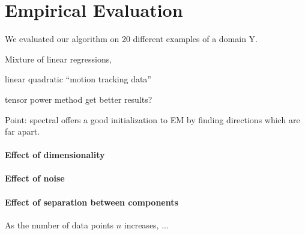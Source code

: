 \section{Empirical Evaluation}
\label{sec:evaluation}

We evaluated our algorithm on 20 different examples of a domain Y.

Mixture of linear regressions, 

linear 
quadratic
``motion tracking data''

tensor power method get better results?

Point: spectral offers a good initialization to EM by finding directions which
are far apart.

\paragraph{Effect of dimensionality}

\paragraph{Effect of noise}

\paragraph{Effect of separation between components}

As the number of data points $n$ increases, ...
